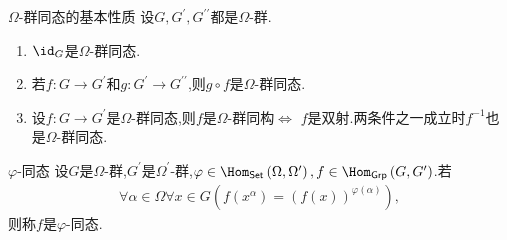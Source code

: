 \begin{proposition}{$\Omega$-群同态的基本性质}{}
	设$G,G^{\prime},G^{\prime\prime}$都是$\Omega$-群.
	\begin{enumerate}
		\item $\id_{G}$是$\Omega$-群同态.
		\item 若$f:G\to G^{\prime}$和$g:G^{\prime}\to G^{\prime\prime}$,则$g\circ f$是$\Omega$-群同态.
		\item 设$f:G\to G^{\prime}$是$\Omega$-群同态,则$f$是$\Omega$-群同构$\iff$ $f$是双射.两条件之一成立时$f^{-1}$也是$\Omega$-群同态.
	\end{enumerate}
\end{proposition}

\begin{definition}{$\varphi$-同态}{}
	设$G$是$\Omega$-群,$G^{\prime}$是$\Omega^{\prime}$-群,$\varphi\in\Hom_{\mathsf{Set}}\left(\Omega,\Omega^{\prime}\right),f\in\Hom_{\mathsf{Grp}}\left(G,G^{\prime}\right)$.若
	\begin{align*}
		\forall\alpha\in\Omega\forall x\in G\left(f\left(x^{\alpha}\right)=\left(f\left(x\right)\right)^{\varphi\left(\alpha\right)}\right),
	\end{align*}
	则称$f$是$\varphi$-同态.
\end{definition}


































































